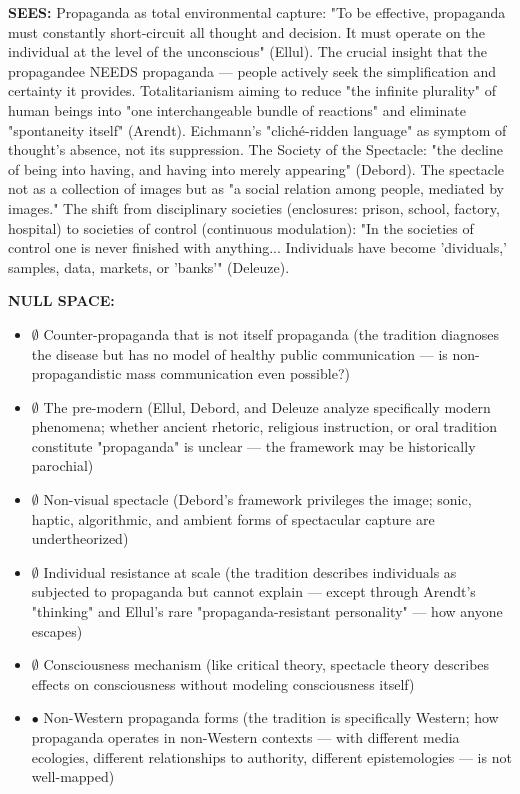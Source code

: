 \textbf{SEES:} Propaganda as total environmental capture: "To be effective, propaganda must constantly short-circuit all thought and decision. It must operate on the individual at the level of the unconscious" (Ellul). The crucial insight that the propagandee NEEDS propaganda — people actively seek the simplification and certainty it provides. Totalitarianism aiming to reduce "the infinite plurality" of human beings into "one interchangeable bundle of reactions" and eliminate "spontaneity itself" (Arendt). Eichmann's "cliché-ridden language" as symptom of thought's absence, not its suppression. The Society of the Spectacle: "the decline of being into having, and having into merely appearing" (Debord). The spectacle not as a collection of images but as "a social relation among people, mediated by images." The shift from disciplinary societies (enclosures: prison, school, factory, hospital) to societies of control (continuous modulation): "In the societies of control one is never finished with anything... Individuals have become 'dividuals,' samples, data, markets, or 'banks'" (Deleuze).


\textbf{NULL SPACE:}

\begin{itemize}[nosep,leftmargin=*]
  \item $\emptyset$ Counter-propaganda that is not itself propaganda (the tradition diagnoses the disease but has no model of healthy public communication — is non-propagandistic mass communication even possible?)
  \item $\emptyset$ The pre-modern (Ellul, Debord, and Deleuze analyze specifically modern phenomena; whether ancient rhetoric, religious instruction, or oral tradition constitute "propaganda" is unclear — the framework may be historically parochial)
  \item $\emptyset$ Non-visual spectacle (Debord's framework privileges the image; sonic, haptic, algorithmic, and ambient forms of spectacular capture are undertheorized)
  \item $\emptyset$ Individual resistance at scale (the tradition describes individuals as subjected to propaganda but cannot explain — except through Arendt's "thinking" and Ellul's rare "propaganda-resistant personality" — how anyone escapes)
  \item $\emptyset$ Consciousness mechanism (like critical theory, spectacle theory describes effects on consciousness without modeling consciousness itself)
  \item $\bullet$ Non-Western propaganda forms (the tradition is specifically Western; how propaganda operates in non-Western contexts — with different media ecologies, different relationships to authority, different epistemologies — is not well-mapped)
\end{itemize}


